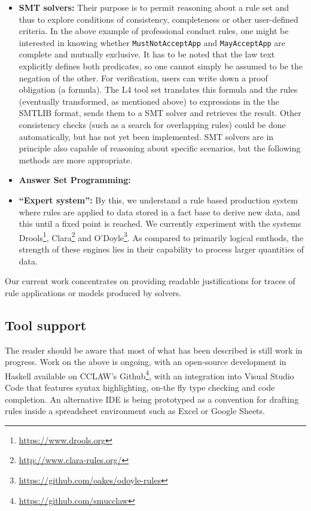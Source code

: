 \documentclass[runningheads]{llncs}
\begin{document}
\begin{itemize}
\item \textbf{SMT solvers:} Their purpose is to permit reasoning about a rule
  set and thus to explore conditions of consistency, completeness or other
  user-defined criteria. In the above example of professional conduct rules,
  one might be interested in knowing whether
  \texttt{MustNotAcceptApp} and \texttt{MayAcceptApp} are complete and
  mutually exclusive. It has to be noted that the law text explicitly defines
  both predicates, so one cannot simply be assumed to be the negation of the
  other. For verification, users can write down a proof obligation (a formula). The L4
  tool set translates this formula and the rules (eventually transformed, as
  mentioned above) to expressions in the the SMTLIB format, sends them to a
  SMT solver and retrieves the result.  Other consistency checks (such as a search for
  overlapping rules) could be done automatically, but has not yet been
  implemented. SMT solvers are in principle also capable of reasoning about
  specific scenarios, but the following methods are more appropriate.
\item \textbf{Answer Set Programming:}
\item \textbf{``Expert system'':} By this, we understand a rule based
  production system where rules are applied to data stored in a fact base to
  derive new data, and this until a fixed point is reached. We currently
  experiment with the systems Drools\footnote{\url{https://www.drools.org}},
  Clara\footnote{\url{http://www.clara-rules.org/}} and
  O'Doyle\footnote{\url{https://github.com/oakes/odoyle-rules}}. As compared
  to primarily logical emthods, the strength
  of these engines lies in their capability to process larger quantities of
  data.
\end{itemize}
Our current work concentrates on providing readable justifications for traces
of rule applications or models produced by solvers.


\subsection{Tool support}\label{sec:tool_support}

The reader should be aware that most of what has been described is still work
in progress. Work on the above is ongoing, with an open-source development in
Haskell available on CCLAW's Github\footnote{\url{https://github.com/smucclaw}}, with an integration into
Visual Studio Code that features syntax highlighting, on-the fly type checking
and code completion. An alternative IDE is being prototyped as a convention for
drafting rules inside a spreadsheet environment such as Excel or Google Sheets.
\end{document}
